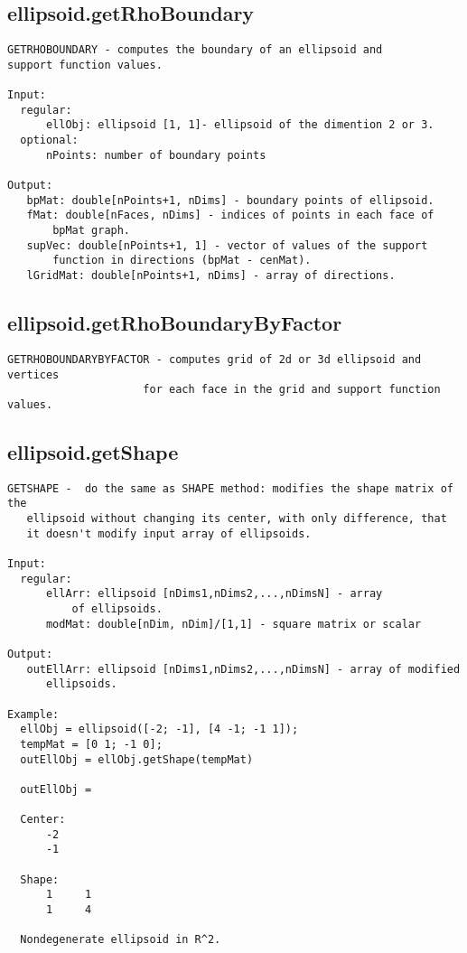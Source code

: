 \subsection{\texorpdfstring{ellipsoid.getRhoBoundary}{getRhoBoundary}}\label{method:ellipsoid.getRhoBoundary}
\begin{verbatim}
GETRHOBOUNDARY - computes the boundary of an ellipsoid and
support function values.

Input:
  regular:
      ellObj: ellipsoid [1, 1]- ellipsoid of the dimention 2 or 3.
  optional:
      nPoints: number of boundary points

Output:
   bpMat: double[nPoints+1, nDims] - boundary points of ellipsoid.
   fMat: double[nFaces, nDims] - indices of points in each face of
       bpMat graph.
   supVec: double[nPoints+1, 1] - vector of values of the support
       function in directions (bpMat - cenMat).
   lGridMat: double[nPoints+1, nDims] - array of directions.
\end{verbatim}
\subsection{\texorpdfstring{ellipsoid.getRhoBoundaryByFactor}{getRhoBoundaryByFactor}}\label{method:ellipsoid.getRhoBoundaryByFactor}
\begin{verbatim}
GETRHOBOUNDARYBYFACTOR - computes grid of 2d or 3d ellipsoid and vertices
                     for each face in the grid and support function values.
\end{verbatim}
\subsection{\texorpdfstring{ellipsoid.getShape}{getShape}}\label{method:ellipsoid.getShape}
\begin{verbatim}
GETSHAPE -  do the same as SHAPE method: modifies the shape matrix of the
   ellipsoid without changing its center, with only difference, that
   it doesn't modify input array of ellipsoids.

Input:
  regular:
      ellArr: ellipsoid [nDims1,nDims2,...,nDimsN] - array
          of ellipsoids.
      modMat: double[nDim, nDim]/[1,1] - square matrix or scalar

Output:
   outEllArr: ellipsoid [nDims1,nDims2,...,nDimsN] - array of modified
      ellipsoids.

Example:
  ellObj = ellipsoid([-2; -1], [4 -1; -1 1]);
  tempMat = [0 1; -1 0];
  outEllObj = ellObj.getShape(tempMat)

  outEllObj =

  Center:
      -2
      -1

  Shape:
      1     1
      1     4

  Nondegenerate ellipsoid in R^2.
\end{verbatim}
